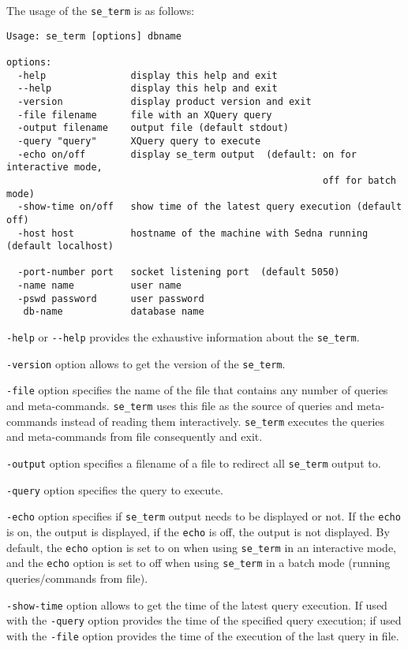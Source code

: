 \documentclass[a4paper,12pt]{article}
\begin{document}
The usage of the \verb!se_term! is as follows:

\begin{verbatim}
Usage: se_term [options] dbname

options:
  -help			      display this help and exit
  --help		      display this help and exit
  -version		      display product version and exit
  -file filename	  file with an XQuery query			  
  -output filename	  output file (default stdout)
  -query "query"	  XQuery query to execute		
  -echo on/off		  display se_term output  (default: on for interactive mode,
                                                        off for batch mode)
  -show-time on/off	  show time of the latest query execution (default off)
  -host host		  hostname of the machine with Sedna running (default localhost)
		
  -port-number port	  socket listening port  (default 5050)
  -name name		  user name 
  -pswd password	  user password 
   db-name		      database name
\end{verbatim}

\verb!-help! or \verb!--help! provides the exhaustive information about the \verb!se_term!.

\verb!-version! option allows to get the version of the \verb!se_term!.

\verb!-file! option specifies the name of the file that contains any number of queries and meta-commands. \verb!se_term! uses this file as the source of queries and meta-commands instead of reading them interactively. \verb!se_term! executes the queries and meta-commands from file consequently and exit.

\verb!-output! option specifies a filename of a file to redirect all \verb!se_term! output to. 

\verb!-query! option specifies the query to execute.

\verb!-echo! option specifies if \verb!se_term! output needs to be displayed or not. If the \verb!echo! is on, the output is displayed, if the \verb!echo! is off, the output is not displayed. By default, the \verb!echo! option is set to on when using \verb!se_term! in an interactive mode, and the \verb!echo! option is set to off when using \verb!se_term! in a batch mode (running queries/commands from file).

\verb!-show-time! option allows to get the time of the latest query execution. If used with the \verb!-query! option provides the time of the specified query execution; if used with the \verb!-file! option provides the time of the execution of the last query in file.
\end{document}
